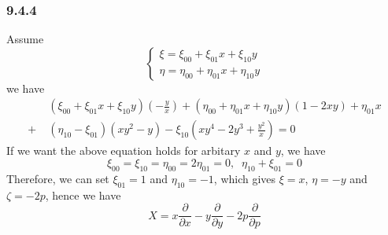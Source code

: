 \documentclass[]{ctexart}
\begin{document}
\subsubsection*{9.4.4}
Assume 
\begin{equation*}
\begin{cases}
\xi=\xi_{00}+\xi_{01}x+\xi_{10}y\\
\eta=\eta_{00}+\eta_{01}x+\eta_{10}y
\end{cases}
\end{equation*}
we have 
\begin{align*}
&(\xi_{00}+\xi_{01}x+\xi_{10}y)\left(-\frac{y}{x}\right)+(\eta_{00}+\eta_{01}x+\eta_{10}y)(1-2xy)+\eta_{01}x\\
+{\;}&(\eta_{10}-\xi_{01})(xy^2-y)-\xi_{10}\left(xy^4-2y^3+\frac{y^2}{x}\right)=0
\end{align*}
If we want the above equation holds for arbitary $x$ and $y$, we have 
\begin{equation*}
\xi_{00}=\xi_{10}=\eta_{00}=2\eta_{01}=0,\;\;\eta_{10}+\xi_{01}=0
\end{equation*}
Therefore, we can set $\xi_{01}=1$ and $\eta_{10}=-1$, which gives $\xi=x$, $\eta=-y$ and $\zeta=-2p$, hence we have 
\begin{equation*}
X=x\frac{\partial}{\partial x}-y\frac{\partial}{\partial y}-2p\frac{\partial}{\partial p}
\end{equation*}
\end{document}
